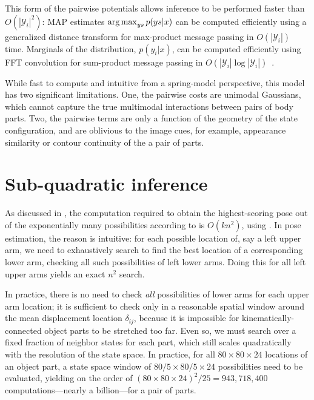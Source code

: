 {This form of the pairwise potentials allows inference to be performed faster than $O(|\mathcal{Y}_i|^2)$:  MAP estimates $\mathop{\arg\max}_{ys} p(ys | x)$ can be computed efficiently using a generalized distance transform for max-product message passing in $O(|\mathcal{Y}_i|)$ time.  Marginals of the distribution, $p(y_i | x)$, can be computed efficiently using FFT convolution for sum-product message passing in $O(|\mathcal{Y}_i| \log |\mathcal{Y}_i|)$~\cite{felz05}.

While fast to compute and intuitive from a spring-model perspective, this model has two significant limitations.  One, the pairwise costs are unimodal Gaussians, which cannot capture the true multimodal interactions between pairs of body parts.  Two, the pairwise terms are only a function of the geometry of the state configuration, and are oblivious to the image cues, for example, appearance similarity or contour continuity of the a pair of parts.
}

\section{Sub-quadratic inference}\label{sec:dt}

As discussed in , the computation required to obtain the 
highest-scoring pose out of the exponentially many possibilities according to 
 is $O(kn^2)$, using .  In pose 
estimation, the reason is intuitive: for each possible location of, say a left 
upper arm, we need to exhaustively search to find the best location of a 
corresponding lower arm, checking all such possibilities of left lower arms.  
Doing this for all left upper arms yields an exact $n^2$ search.

In practice, there is no need to check {\em all} possibilities of lower arms 
for each upper arm location; it is sufficient to check only in a reasonable 
spatial window around the mean displacement location $\delta_{ij}$, because it 
is impossible for kinematically-connected object parts to be stretched too far.  
Even so, we must search over a fixed fraction of neighbor states for each part, 
which still scales quadratically with the resolution of the state space. In 
practice, for all $80 \times 80 \times 24$ locations of an object part, a state 
space window of $80/5 \times 80/5 \times 24$ possibilities need to be 
evaluated, yielding on the order of $ (80\times 80 \times 24)^2 / 25 = 
943,718,400$ computations---nearly a billion---for a pair of parts.

